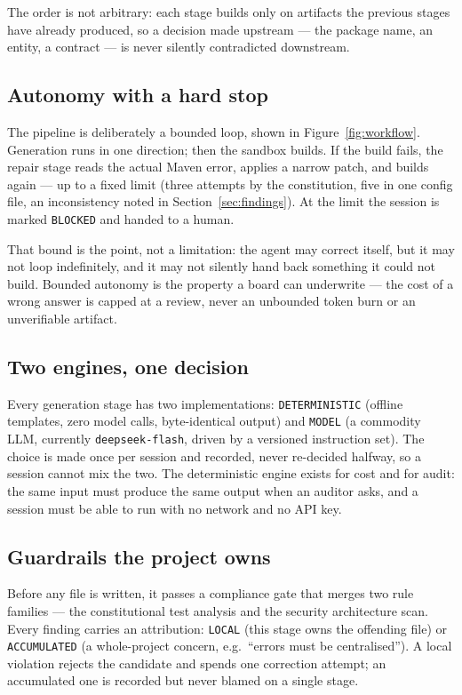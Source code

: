 \documentclass[11pt,a4paper]{article}
\begin{document}
The order is not arbitrary: each stage builds only on artifacts the previous stages
have already produced, so a decision made upstream --- the package name, an entity, a
contract --- is never silently contradicted downstream.

\subsection{Autonomy with a hard stop}

The pipeline is deliberately a bounded loop, shown in Figure~\ref{fig:workflow}.
Generation runs in one direction; then the sandbox builds. If the build fails, the
repair stage reads the actual Maven error, applies a narrow patch, and builds again
--- up to a fixed limit (three attempts by the constitution, five in one config
file, an inconsistency noted in Section~\ref{sec:findings}). At the limit the session
is marked \texttt{BLOCKED} and handed to a human.

That bound is the point, not a limitation: the agent may correct itself, but it may
not loop indefinitely, and it may not silently hand back something it could not build.
Bounded autonomy is the property a board can underwrite --- the cost of a wrong answer
is capped at a review, never an unbounded token burn or an unverifiable artifact.

\subsection{Two engines, one decision}

Every generation stage has two implementations: \texttt{DETERMINISTIC} (offline
templates, zero model calls, byte-identical output) and \texttt{MODEL} (a commodity
LLM, currently \texttt{deepseek-flash}, driven by a versioned instruction set). The
choice is made once per session and recorded, never re-decided halfway, so a session
cannot mix the two. The deterministic engine exists for cost and for audit: the same
input must produce the same output when an auditor asks, and a session must be able to
run with no network and no API key.

\subsection{Guardrails the project owns}

Before any file is written, it passes a compliance gate that merges two rule families
--- the constitutional test analysis and the security architecture scan. Every
finding carries an attribution: \texttt{LOCAL} (this stage owns the offending file) or
\texttt{ACCUMULATED} (a whole-project concern, e.g.\ ``errors must be centralised'').
A local violation rejects the candidate and spends one correction attempt; an
accumulated one is recorded but never blamed on a single stage.
\end{document}
